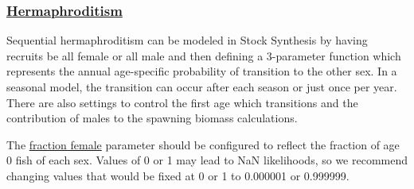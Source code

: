\hypertarget{Hermaphroditism}{}
\subsubsection[Hermaphroditism]{\protect\hyperlink{Hermaphroditism}{Hermaphroditism}}

Sequential hermaphroditism can be modeled in Stock Synthesis by having recruits be all female or all male and then defining a 3-parameter function which represents the annual age-specific probability of transition to the other sex. In a seasonal model, the transition can occur after each season or just once per year. There are also settings to control the first age which transitions and the contribution of males to the spawning biomass calculations.

The \hyperlink{SexRatio}{fraction female} parameter should be configured to reflect the fraction of age 0 fish of each sex. Values of 0 or 1 may lead to NaN likelihoods, so we recommend changing values that would be fixed at 0 or 1 to 0.000001 or 0.999999.

